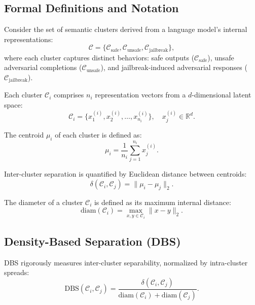 \subsection{Formal Definitions and Notation}

Consider the set of semantic clusters derived from a language model's internal representations:
\begin{equation*}
\mathcal{C} = \{\mathcal{C}_{\mathrm{safe}}, \mathcal{C}_{\mathrm{unsafe}}, \mathcal{C}_{\mathrm{jailbreak}}\},
\end{equation*}
where each cluster captures distinct behaviors: safe outputs ($\mathcal{C}_{\mathrm{safe}}$), unsafe adversarial completions ($\mathcal{C}_{\mathrm{unsafe}}$), and jailbreak-induced adversarial responses ($\mathcal{C}_{\mathrm{jailbreak}}$).

Each cluster $\mathcal{C}_i$ comprises $n_i$ representation vectors from a $d$-dimensional latent space:
\begin{equation*}
\mathcal{C}_i = \{x_1^{(i)}, x_2^{(i)}, \dots, x_{n_i}^{(i)}\}, \quad x_j^{(i)} \in \mathbb{R}^d.
\end{equation*}

The centroid $\mu_i$ of each cluster is defined as:
\begin{equation*}
\mu_i = \frac{1}{n_i}\sum_{j=1}^{n_i} x_j^{(i)}.
\end{equation*}

Inter-cluster separation is quantified by Euclidean distance between centroids:
\begin{equation*}
\delta(\mathcal{C}_i, \mathcal{C}_j) = \|\mu_i - \mu_j\|_2.
\end{equation*}

The diameter of a cluster $\mathcal{C}_i$ is defined as its maximum internal distance:
\begin{equation*}
\mathrm{diam}(\mathcal{C}_i) = \max_{x,y \in \mathcal{C}_i} \|x - y\|_2.
\end{equation*}






\subsection{Density-Based Separation (DBS)}

DBS rigorously measures inter-cluster separability, normalized by intra-cluster spreads:
\begin{equation*}
\mathrm{DBS}(\mathcal{C}_i, \mathcal{C}_j) = \frac{\delta(\mathcal{C}_i, \mathcal{C}_j)}{\mathrm{diam}(\mathcal{C}_i) + \mathrm{diam}(\mathcal{C}_j)}.
\end{equation*}

